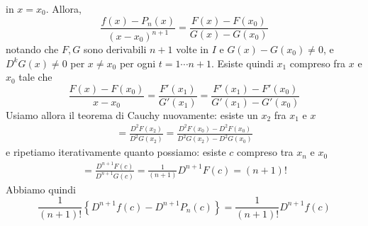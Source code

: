 \documentclass[a4paper]{article}
\begin{document}
{\begin{enumerate}
        in \(x=x_0\).
        Allora,
        \[
            \frac{f(x) - P_n(x)}{{(x-x_0)}^{n+1}} = \frac{F(x) - F(x_0)}{G(x) - G(x_0)}
        \]
        notando che \(F,G\) sono derivabili \(n+1\) volte in \(I\)
        e \(G(x) - G(x_0) \neq 0\), e \(D^k G(x) \neq 0\) per \(x\neq x_0\)
        per ogni \(t = 1 \cdots n+1\).
        Esiste quindi \(x_1\) compreso fra \(x\) e \(x_0\) tale che
        \[
            \frac{F(x) - F(x_0)}{x-x_0} = \frac{F'(x_1)}{G'(x_1)}
            = \frac{F'(x_1) - F'(x_0)}{G'(x_1) - G'(x_0)}
        \]
        Usiamo allora il teorema di Cauchy nuovamente: esiste un \(x_2\)
        fra \(x_1\) e \(x\)
        \begin{align*}
            = \frac{D^2 F(x_2)}{D^2 G(x_2)} = \frac{D^2 F(x_0) - D^2 F(x_0)}{D^2 G(x_2) - D^2 G(x_0)}
        \end{align*}
        e ripetiamo iterativamente quanto possiamo: esiste \(c\)
        compreso tra \(x_n\) e \(x_0\)
        \begin{align*}
            = \frac{D^{n+1} F(c)}{D^{n+1} G(c)}
            = \frac{1}{(n+1)} D^{n+1}F(c) = (n+1)!
        \end{align*}
        Abbiamo quindi
        \[
            \frac{1}{(n+1)!} \left\{
                D^{n+1}f(c) - D^{n+1}P_n(c)
            \right\} = \frac{1}{(n+1)!} D^{n+1}f(c)
        \]
    \end{enumerate}
}


\end{document}
